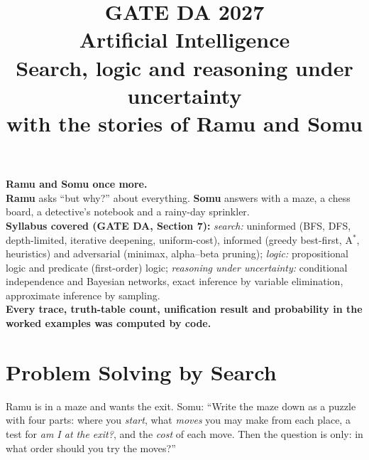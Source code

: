\documentclass[11pt,a4paper]{article}
\title{\Huge\bfseries GATE DA 2027\\[4pt] \Large Artificial Intelligence\\[8pt]
\large Search, logic and reasoning under uncertainty\\
with the stories of Ramu and Somu}
\author{}
\date{}
\begin{document}
\maketitle
\thispagestyle{empty}

\begin{center}
\begin{tcolorbox}[colback=yellow!10,colframe=orange!80!black,width=0.9\textwidth,breakable]
\textbf{Ramu and Somu once more.}\\
\textbf{Ramu} asks ``but why?'' about everything. \textbf{Somu} answers with a maze, a chess board, a detective's notebook and a rainy-day sprinkler.\\[4pt]
\textbf{Syllabus covered (GATE DA, Section 7):} \emph{search:} uninformed (BFS, DFS, depth-limited, iterative deepening, uniform-cost), informed (greedy best-first, A$^*$, heuristics) and adversarial (minimax, alpha--beta pruning); \emph{logic:} propositional logic and predicate (first-order) logic; \emph{reasoning under uncertainty:} conditional independence and Bayesian networks, exact inference by variable elimination, approximate inference by sampling.\\[4pt]
\textbf{Every trace, truth-table count, unification result and probability in the worked examples was computed by code.}
\end{tcolorbox}
\end{center}

\tableofcontents
\newpage

\section{Problem Solving by Search}

\begin{story}
Ramu is in a maze and wants the exit. Somu: ``Write the maze down as a puzzle with four parts: where you \emph{start}, what \emph{moves} you may make from each place, a test for \emph{am I at the exit?}, and the \emph{cost} of each move. Then the question is only: in what order should you try the moves?''
\end{story}
\end{document}
